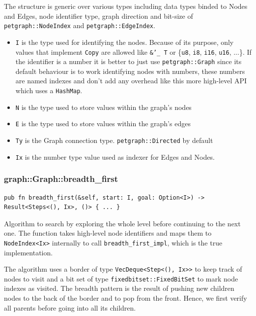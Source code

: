The structure is generic over various types including data types binded to Nodes and Edges, node identifier type, graph direction and bit-size of
\texttt{petgraph::NodeIndex} and \texttt{petgraph::EdgeIndex}.

\begin{itemize}
 \item \texttt{I} is the type used for identifying the nodes. Because of its purpose, only values that implement
 \texttt{Copy} are allowed like \texttt{\&'\_ T} or \{\texttt{u8}, \texttt{i8}, \texttt{i16}, \texttt{u16}, ...\}. 
 If the identifier is a number it is better to just use \texttt{petgraph::Graph} since its default
 behaviour is to work identifying nodes with numbers, these numbers are named indexes and don't add any overhead
 like this more high-level API which uses a \texttt{HashMap}.
 \item \texttt{N} is the type used to store values within the graph's nodes
 \item \texttt{E} is the type used to store values within the graph's edges
 \item \texttt{Ty} is the Graph connection type. \texttt{petgraph::Directed} by default
 \item \texttt{Ix} is the number type value used as indexer for Edges and Nodes.
\end{itemize}

\subsubsection{graph::Graph::breadth\_first}
\begin{verbatim}
pub fn breadth_first(&self, start: I, goal: Option<I>) -> Result<Steps<(), Ix>, ()> { ... }
\end{verbatim}

Algorithm to search by exploring the whole level before continuing to the next one.
The function takes high-level node identifiers and maps them to \texttt{NodeIndex<Ix>} internally to
call \texttt{breadth\_first\_impl}, which is the true implementation.

The algorithm uses a border of type \texttt{VecDeque<Step<(), Ix>>} to keep track of nodes to visit and
a bit set of type \texttt{fixedbitset::FixedBitSet} to mark node indexes as visited.
The breadth pattern is the result of pushing new children nodes to the back of the border
and to pop from the front. Hence, we first verify all parents before going into all its children.


